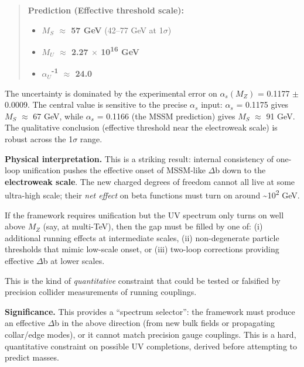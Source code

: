 \documentclass[11pt,a4paper]{article}
\theoremstyle{remark}
\providecommand{\tightlist}{%
  \setlength{\itemsep}{0pt}\setlength{\parskip}{0pt}}
\begin{document}
\begin{quote}
\textbf{Prediction (Effective threshold scale):}

\begin{itemize}
\tightlist
\item
  \textbf{\(M_S\) \ensuremath{\approx} 57 GeV} (42--77 GeV at 1\ensuremath{\sigma})
\item
  \textbf{\(M_U\) \ensuremath{\approx} 2.27 \ensuremath{\times} 10\textsuperscript{16} GeV}
\item
  \textbf{\(\ensuremath{\alpha}_U\)\textsuperscript{-1} \ensuremath{\approx} 24.0}
\end{itemize}
\end{quote}

The uncertainty is dominated by the experimental error on \(\ensuremath{\alpha}_s(M_Z)\) = 0.1177 \ensuremath{\pm} 0.0009.
The central value is sensitive to the precise \(\ensuremath{\alpha}_s\) input: \(\ensuremath{\alpha}_s\) = 0.1175 gives
\(M_S\) \ensuremath{\approx} 67 GeV, while \(\ensuremath{\alpha}_s\) = 0.1166 (the MSSM prediction) gives \(M_S\) \ensuremath{\approx} 91 GeV.
The qualitative conclusion (effective threshold near the electroweak scale)
is robust across the 1\ensuremath{\sigma} range.

\textbf{Physical interpretation.} This is a striking result: internal consistency of
one-loop unification pushes the effective onset of MSSM-like \ensuremath{\Delta}b down to the
\textbf{electroweak scale}. The new charged degrees of freedom cannot all live at
some ultra-high scale; their \emph{net effect} on beta functions must turn on around
\textasciitilde10\textsuperscript{2} GeV.

If the framework requires unification but the UV spectrum only turns on well
above \(M_Z\) (say, at multi-TeV), then the gap must be filled by one of:
(i) additional running effects at intermediate scales,
(ii) non-degenerate particle thresholds that mimic low-scale onset, or
(iii) two-loop corrections providing effective \ensuremath{\Delta}b at lower scales.

This is the kind of \emph{quantitative} constraint that could be tested or falsified
by precision collider measurements of running couplings.

\textbf{Significance.} This provides a ``spectrum selector'': the framework must
produce an effective \ensuremath{\Delta}b in the above direction (from new bulk fields or
propagating collar/edge modes), or it cannot match precision gauge couplings.
This is a hard, quantitative constraint on possible UV completions, derived
before attempting to predict masses.
\end{document}

